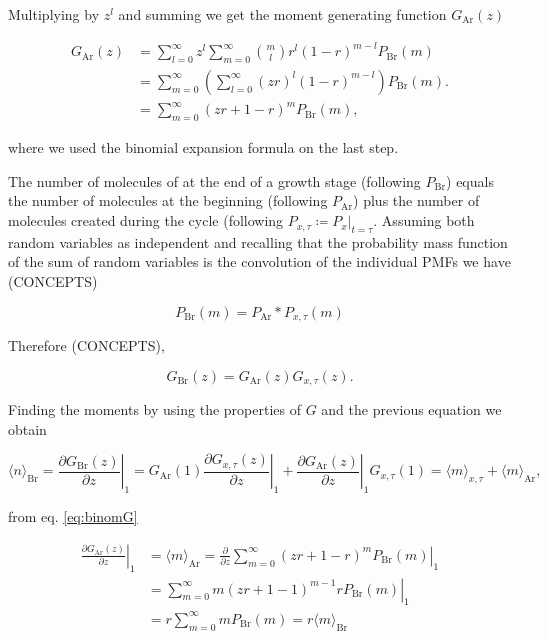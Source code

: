 Multiplying by $z^l$ and summing we get the moment generating function $G_\text{Ar}(z)$

\begin{equation}
  \label{eq:binomG}
  \begin{split}
    G_\text{Ar}(z) &= \sum_{l=0}^\infty z^l\sum_{m=0}^\infty {m\choose l}r^l(1-r)^{m-l}P_\text{Br}(m)\\
    &= \sum_{m=0}^\infty\left(\sum_{l=0}^\infty (zr)^l(1-r)^{m-l}\right)P_\text{Br}(m).\\
    &= \sum_{m=0}^\infty(zr+1-r)^{m}P_\text{Br}(m),
  \end{split}
\end{equation}

where we used the binomial expansion formula on the last step.

The number of molecules of at the end of a growth stage (following $P_\text{Br}$) equals the number of molecules at the beginning (following $P_\text{Ar}$) plus the number of molecules created during the cycle (following $P_{x,\tau} \coloneqq P_x|_{t=\tau}$. Assuming both random variables as independent and recalling that the probability mass function of the sum of random variables is the convolution of the individual PMFs we have (CONCEPTS)

\begin{equation*}
  P_\text{Br}(m) = P_\text{Ar}\ast P_{x,\tau}(m)
\end{equation*}

Therefore (CONCEPTS),

\begin{equation}
  G_\text{Br}(z) = G_\text{Ar}(z)G_{x,\tau}(z).
\end{equation}

Finding the moments by using the properties of $G$ and the previous equation we obtain

\begin{equation*}
  \langle n\rangle_\text{Br} = \left.\frac{\partial G_\text{Br}(z)}{\partial z}\right|_1 = G_\text{Ar}(1)\left.\frac{\partial G_{x,\tau}(z)}{\partial z}\right|_1 + \left.\frac{\partial G_\text{Ar}(z)}{\partial z}\right|_1G_{x,\tau}(1) = \langle m\rangle_{x,\tau} + \langle m\rangle_\text{Ar},
\end{equation*}

from eq. \ref{eq:binomG} 

\begin{equation*}
  \begin{split}
  \left.\frac{\partial G_\text{Ar}(z)}{\partial z}\right|_1 &= \langle m\rangle_\text{Ar} = \left.\frac{\partial}{\partial z} \sum_{m=0}^\infty(zr+1-r)^mP_\text{Br}(m)\right|_1\\
&= \left.\sum_{m=0}^\infty m(zr+1-1)^{m-1}rP_\text{Br}(m)\right|_1\\
&= r\sum_{m=0}^\infty mP_\text{Br}(m) = r\langle m\rangle_\text{Br}
  \end{split}
\end{equation*}
  

